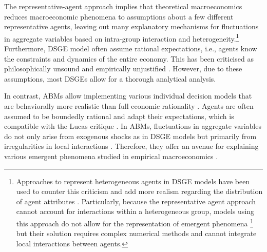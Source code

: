 The representative-agent approach implies that theoretical macroeconomics reduces macroeconomic phenomena to assumptions about a few different representative agents, leaving out many explanatory mechanisms for fluctuations in aggregate variables based on intra-group interaction and heterogeneity.\footnote{Approaches to represent heterogeneous agents in DSGE models have been used to counter this criticism and add more realism regarding the distribution of agent attributes \citep[see for example the review by][]{Heathcote2009}.
Particularly, because the representative agent approach cannot account for interactions within a heterogeneous group, models using this approach do not allow for the representation of emergent phenomena \citep{Kirman1992}\footnote{Here, we use a weak notion of emergence, which allows explaining macro-phenomena on the basis of micro-interactions of the systems constituents that differ from the explained macro-phenomena. This is opposed to strong emergence, that embraces the irreducibility of macro-phenomena to lower-level dynamics. For a discussion see \citet{Bedau1997}.}
but their solution requires complex numerical methods and cannot integrate local interactions between agents.}
Furthermore, DSGE model often assume rational expectations, i.e., agents know the constraints and dynamics of the entire economy. This has been criticised as philosophically unsound and empirically unjustified \citep{Kirman2014}.
However, due to these assumptions, most DSGEs allow for a thorough analytical analysis.

In contrast, ABMs allow implementing various individual decision models that are behaviorally more realistic than full economic rationality  \citep{Mueller-Hansen2017}.
Agents are often assumed to be boundedly rational and adapt their expectations, which is compatible with the Lucas critique \citep{Evans2006}.
In ABMs, fluctuations in aggregate variables do not only arise from exogenous shocks as in DSGE models but primarily from irregularities in local interactions \citep{Tesfatsion2001}.
Therefore, they offer an avenue for explaining various emergent phenomena studied in empirical macroeconomics \citep{Tesfatsion2006a}.

